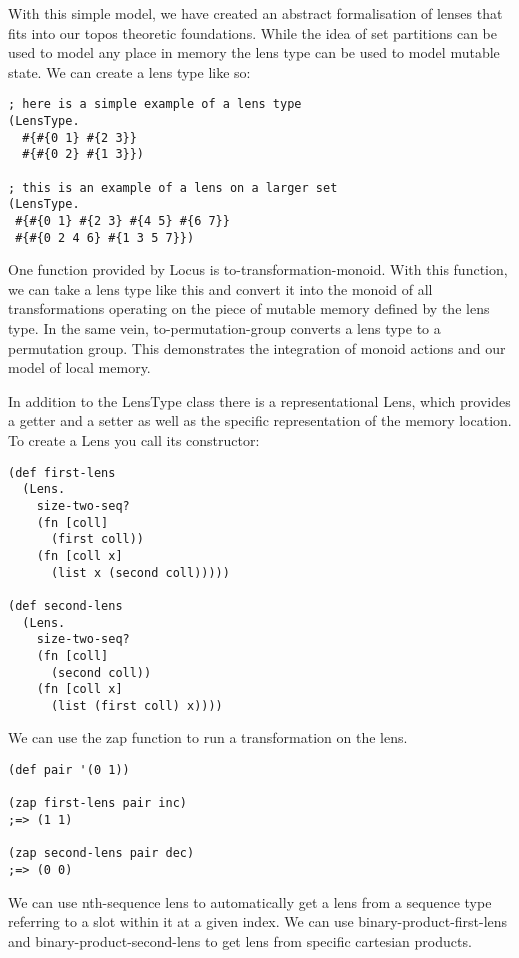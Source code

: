 \documentclass[a4paper,11pt]{report}
\begin{document}
With this simple model, we have created an abstract formalisation of lenses that fits into our topos theoretic foundations. While the idea of set partitions can be used to model any place in memory the lens type can be used to model mutable state. We can create a lens type like so:

\lstset {language=Lisp}
\begin{lstlisting}
; here is a simple example of a lens type
(LensType. 
  #{#{0 1} #{2 3}} 
  #{#{0 2} #{1 3}})

; this is an example of a lens on a larger set
(LensType. 
 #{#{0 1} #{2 3} #{4 5} #{6 7}}
 #{#{0 2 4 6} #{1 3 5 7}})
\end{lstlisting}

 One function provided by Locus is to-transformation-monoid. With this function, we can take a lens type like this and convert it into the monoid of all transformations operating on the piece of mutable memory defined by the lens type. In the same vein, to-permutation-group converts a lens type to a permutation group. This demonstrates the integration of monoid actions and our model of local memory.

\newpage 

In addition to the LensType class there is a representational Lens, which provides a getter and a setter as well as the specific representation of the memory location. To create a Lens you call its constructor:

\lstset {language=Lisp}
\begin{lstlisting}
(def first-lens 
  (Lens. 
    size-two-seq? 
    (fn [coll]
      (first coll))
    (fn [coll x]
      (list x (second coll)))))
      
(def second-lens 
  (Lens. 
    size-two-seq? 
    (fn [coll]
      (second coll))
    (fn [coll x]
      (list (first coll) x))))
\end{lstlisting}

We can use the zap function to run a transformation on the lens.

\lstset {language=Lisp}
\begin{lstlisting}
(def pair '(0 1))

(zap first-lens pair inc)
;=> (1 1)

(zap second-lens pair dec)
;=> (0 0)
\end{lstlisting}

We can use nth-sequence lens to automatically get a lens from a sequence type referring to a slot within it at a given index. We can use binary-product-first-lens and binary-product-second-lens to get lens from specific cartesian products.
\end{document}
